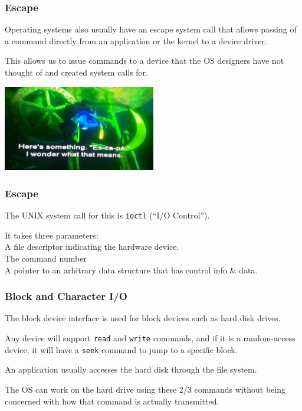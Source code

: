 \begin{frame}
\frametitle{Escape}

Operating systems also usually have an \alert{escape} system call that allows passing of a command directly from an application or the kernel to a device driver. 

This allows us to issue commands to a device that the OS designers have not thought of and created system calls for. 

\begin{center}
	\includegraphics[width=0.5\textwidth]{images/escape-dory.jpg}
\end{center}

\end{frame}

\begin{frame}
\frametitle{Escape}


The UNIX system call for this is \texttt{ioctl} (``I/O Control''). 

It takes three parameters:\\
\quad A file descriptor indicating the hardware device.\\
\quad The command number\\
\quad A pointer to an arbitrary data structure that has control info \& data.

\end{frame}

\begin{frame}
\frametitle{Block and Character I/O}

The block device interface is used for block devices such as hard disk drives. 

Any device will support \texttt{read} and \texttt{write} commands, and if it is a random-access device, it will have a \texttt{seek} command to jump to a specific block. 

An application usually accesses the hard disk through the file system.

The OS can work on the hard drive using these 2/3 commands without being concerned with how that command is actually transmitted.

\end{frame}


